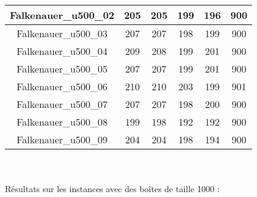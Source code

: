 \documentclass{article}
\begin{document}
\begin{tabular} {|c|c|c|c|c|c|}
    Falkenauer\_u500\_02 & 205 & 205 & 199 & 196 & 900 \\ \hline
    Falkenauer\_u500\_03 & 207 & 207 & 198 & 199 & 900 \\ \hline
    Falkenauer\_u500\_04 & 209 & 208 & 199 & 201 & 900 \\ \hline
    Falkenauer\_u500\_05 & 207 & 207 & 199 & 201 & 900 \\ \hline
    Falkenauer\_u500\_06 & 210 & 210 & 203 & 199 & 901 \\ \hline
    Falkenauer\_u500\_07 & 207 & 207 & 198 & 200 & 900 \\ \hline
    Falkenauer\_u500\_08 & 199 & 198 & 192 & 192 & 900 \\ \hline
    Falkenauer\_u500\_09 & 204 & 204 & 198 & 194 & 900 \\ \hline
\end{tabular}\\ \\

Résultats sur les instances avec des boîtes de taille 1000 :\\
\end{document}
